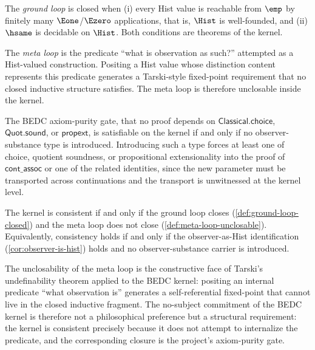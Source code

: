 \begin{definition}
\label{def:ground-loop-closed}
The \emph{ground loop} is closed when (i) every Hist value is reachable from \(\emp\) by finitely many \(\Eone\)/\(\Ezero\) applications, that is, \(\Hist\) is well-founded, and (ii) \(\hsame\) is decidable on \(\Hist\). Both conditions are theorems of the kernel.
\end{definition}
\begin{definition}
\label{def:meta-loop-unclosable}
The \emph{meta loop} is the predicate ``what is observation as such?'' attempted as a Hist-valued construction. Positing a Hist value whose distinction content represents this predicate generates a Tarski-style fixed-point requirement that no closed inductive structure satisfies. The meta loop is therefore unclosable inside the kernel.
\end{definition}
\begin{theorem}
\label{thm:axiom-purity-no-subject}
The BEDC axiom-purity gate, that no proof depends on \(\mathsf{Classical.choice}\), \(\mathsf{Quot.sound}\), or \(\mathsf{propext}\), is satisfiable on the kernel if and only if no observer-substance type is introduced. Introducing such a type forces at least one of choice, quotient soundness, or propositional extensionality into the proof of \(\mathsf{cont\_assoc}\) or one of the related identities, since the new parameter must be transported across continuations and the transport is unwitnessed at the kernel level.
\end{theorem}
\begin{theorem}
\label{thm:two-loops-balance}
The kernel is consistent if and only if the ground loop closes (\autoref{def:ground-loop-closed}) and the meta loop does not close (\autoref{def:meta-loop-unclosable}). Equivalently, consistency holds if and only if the observer-as-Hist identification (\autoref{cor:observer-is-hist}) holds and no observer-substance carrier is introduced.
\end{theorem}
\begin{remark}[Reading]
\label{rem:tarski-no-subject}
The unclosability of the meta loop is the constructive face of Tarski's undefinability theorem applied to the BEDC kernel: positing an internal predicate ``what observation is'' generates a self-referential fixed-point that cannot live in the closed inductive fragment. The no-subject commitment of the BEDC kernel is therefore not a philosophical preference but a structural requirement: the kernel is consistent precisely because it does not attempt to internalize the predicate, and the corresponding closure is the project's axiom-purity gate.
\end{remark}

